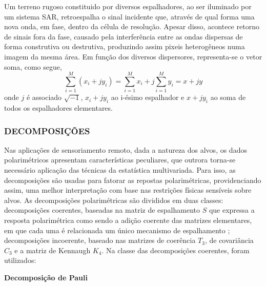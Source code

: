 \documentclass[a4paper,12pt]{article}
\begin{document}
Um terreno rugoso constituido por diversos espalhadores, ao ser iluminado por um sistema SAR, retroespalha o sinal incidente que, através de qual  forma uma nova onda, em fase, dentro da célula de resolução. Apesar disso, acontece retorno de sinais fora da fase, causado pela interferência entre as ondas dispersas de forma construtiva ou destrutiva, produzindo assim pixeis heterogêneos numa imagem da mesma área. Em função dos diversos dispersores, representa-se o vetor soma, como segue,
\begin{equation}
    \sum\limits_{i=1}^M(x_i+jy_i)=\sum\limits_{i=1}^Mx_i+j\sum\limits_{i=1}^My_i=x+jy
\end{equation}
onde $j$ é associado $\sqrt{-1}$, $x_i+jy_i$ ao i-ésimo espalhador e $x+jy_i$ ao soma de todos os espalhadores elementares.

\subsubsection{DECOMPOSIÇÕES}
\label{sec:Dec}

Nas aplicações de sensoriamento remoto, dada a natureza dos alvos, os dados polarimétricos apresentam características peculiares, que outrora torna-se necessário aplicação das técnicas da estatística multivariada. Para isso, as decomposições são usadas para fatorar as repostas polarimétricas, providenciando assim, uma melhor interpretação com base nas restrições físicas sensíveis sobre alvos. As decomposições polarimétricas são divididos em duas classes: decomposições coerentes, baseadas na matriz de espalhamento $S$ que expressa a resposta polarimétrica como sendo a adição coerente das matrizes elementares, em que cada uma é relacionada um único mecanismo de espalhamento \cite{nilosergio2012}; decomposições incoerente, baseado nas matrizes de coerência $T_{3}$, de covariância $C_{3}$ e a matriz de Kennaugh $K_{4}$. Na classe das decomposições coerentes, foram utilizados:

\textbf{Decomposição de Pauli}
\end{document}
